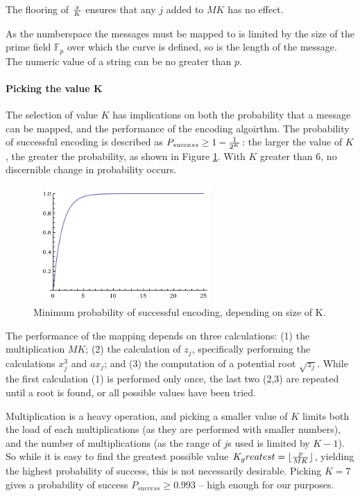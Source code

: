 The flooring of \(x \over K\) ensures that any \(j\) added to \(MK\) has no effect.\cite{MappingAMessage}

As the numberspace the messages must be mapped to is limited by the size of the prime field \(\mathbb{F}_p\) over which the curve is defined, so is the
length of the message. The numeric value of a string can be no greater than \(p\).

\paragraph{Picking the value K}

The selection of value \(K\) has implications on both the probability that a message can be mapped, and the performance of the encoding algoirthm.
The probability of successful encoding is described as \(P_{success} \geq 1 - {1 \over {2^K}}\): the larger the value of \(K\), the greater the probability,
as shown in Figure \ref{fig:probability}. With \(K\) greater than 6, no discernible change in probability occurs.\cite{MappingAMessage}

\begin{figure}[htb]
	\centering
	\includegraphics[width=0.6\textwidth]{maths/encoding-probability}
	\caption{Minimum probability of successful encoding, depending on size of K.}
	\label{fig:probability}
\end{figure}

The performance of the mapping depends on three calculations: (1) the multiplication \(MK\); (2) the calculation of \(z_j\), specifically
performing the calculations \(x_j^3\) and \(ax_j\); and (3) the computation of a potential root \(\sqrt{z_j}\). While the first calculation (1)
is performed only once, the last two (2,3) are repeated until a root is found, or all possible values have been tried.

Multiplication is a heavy operation, and picking a smaller value of \(K\) limits both the load of each multiplications (as they are performed with
smaller numbers), and the number of multiplications (as the range of \(j\)s used is limited by \(K - 1\)). So while it is easy to find the greatest
possible value \(K_greatest = {\lfloor { p \over {MK} }\rfloor}\), yielding the highest probability of success, this is not necessarily desirable.
Picking \(K = 7\) gives a probability of success \(P_{success} \geq 0.993\) -- high enough for our purposes.